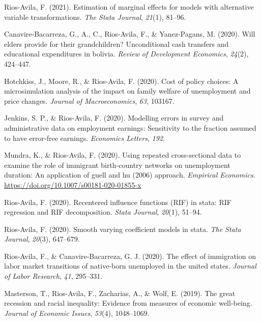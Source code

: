 \documentclass[
  letterpaper,
]{moderncv}
\newlength{\cslhangindent}
\newenvironment{CSLReferences}[2] %
 {\begin{list}{}{%
  \setlength{\itemindent}{0pt}
  \setlength{\leftmargin}{0pt}
  \setlength{\parsep}{0pt}
  \ifodd #1
   \setlength{\leftmargin}{\cslhangindent}
   \setlength{\itemindent}{-1\cslhangindent}
  \fi
  \setlength{\itemsep}{#2\baselineskip}}}
 {\end{list}}
\begin{document}
\begin{CSLReferences}{1}{0}
Rios-Avila, F. (2021). Estimation of marginal effects for models with
alternative variable transformations. \emph{The Stata Journal},
\emph{21}(1), 81--96.

Canavire-Bacarreza, G., A., C., Rios-Avila, F., \& Yanez-Pagans, M.
(2020). Will elders provide for their grandchildren? Unconditional cash
transfers and educational expenditures in bolivia. \emph{Review of
Development Economics}, \emph{24}(2), 424--447.

Hotchkiss, J., Moore, R., \& Rios-Avila, F. (2020). Cost of policy
choices: A microsimulation analysis of the impact on family welfare of
unemployment and price changes. \emph{Journal of Macroeconomics},
\emph{63}, 103167.

Jenkins, S. P., \& Rios-Avila, F. (2020). Modelling errors in survey and
administrative data on employment earnings: Sensitivity to the fraction
assumed to have error-free earnings. \emph{Economics Letters},
\emph{192}.

Mundra, K., \& Rios-Avila, F. (2020). Using repeated cross-sectional
data to examine the role of immigrant birth-country networks on
unemployment duration: An application of guell and hu (2006) approach.
\emph{Empirical Economics}.
\url{https://doi.org/10.1007/s00181-020-01855-x}

Rios-Avila, F. (2020). Recentered influence functions (RIF) in stata:
RIF regression and RIF decomposition. \emph{Stata Journal},
\emph{20}(1), 51--94.

Rios-Avila, F. (2020). Smooth varying coefficient models in stata.
\emph{The Stata Journal}, \emph{20}(3), 647--679.

Rios-Avila, F., \& Canavire-Bacarreza, G. J. (2020). The effect of
immigration on labor market transitions of native-born unemployed in the
united states. \emph{Journal of Labor Research}, \emph{41}, 295--331.

Masterson, T., Rios-Avila, F., Zacharias, A., \& Wolf, E. (2019). The
great recession and racial inequality: Evidence from measures of
economic well-being. \emph{Journal of Economic Issues}, \emph{53}(4),
1048--1069.


\end{CSLReferences}
\end{document}
